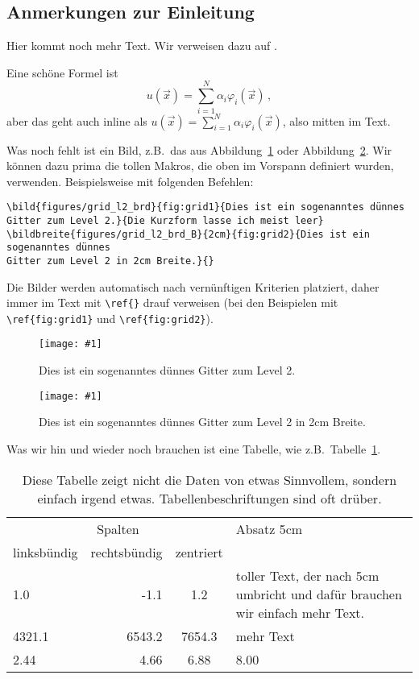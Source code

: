 \documentclass[a4paper,12pt]{llncs}
\numberwithin{equation}{section}
\newcommand{\bild}[4]{
  \begin{figure}[htbp]
    \begin{center}
      \texttt{[image: \#1]}
      \caption[#4]{#3}
      \label{#2}
    \end{center}
  \end{figure}
}
\newcommand{\bildbreite}[5]{
  \begin{figure}[htbp]
    \begin{center}
      \texttt{[image: \#1]}
      \caption[#5]{#4}
      \label{#3}
    \end{center}
  \end{figure}
}
\begin{document}
\subsection{Anmerkungen zur Einleitung}
Hier kommt noch mehr Text. Wir verweisen dazu auf
\cite{thisdocument}.

Eine schöne Formel ist
\[
u(\vec{x}) = \sum_{i=1}^N \alpha_i \varphi_i(\vec{x}) \,,
\]
aber das geht auch inline als $u(\vec{x}) = \sum_{i=1}^N \alpha_i
\varphi_i(\vec{x})$, also mitten im Text.

Was noch fehlt ist ein Bild, z.B.\ das aus
Abbildung~\ref{fig:grid1} oder Abbildung~\ref{fig:grid2}. Wir können dazu prima die tollen Makros,
die oben im Vorspann definiert wurden, verwenden. Beispielsweise mit
folgenden Befehlen:
\begin{verbatim}
\bild{figures/grid_l2_brd}{fig:grid1}{Dies ist ein sogenanntes dünnes
Gitter zum Level 2.}{Die Kurzform lasse ich meist leer}
\bildbreite{figures/grid_l2_brd_B}{2cm}{fig:grid2}{Dies ist ein sogenanntes dünnes
Gitter zum Level 2 in 2cm Breite.}{}
\end{verbatim}
Die Bilder werden automatisch nach vernünftigen Kriterien platziert,
daher immer im Text mit \verb!\ref{}! drauf verweisen (bei den
Beispielen mit \verb!\ref{fig:grid1}! und \verb!\ref{fig:grid2}!).
\bild{figures/grid_l2_brd}{fig:grid1}{Dies ist ein sogenanntes dünnes
  Gitter zum Level 2.}{Die Kurzform lasse ich meist leer}
\bildbreite{figures/grid_l2_brd}{2cm}{fig:grid2}{Dies ist ein sogenanntes dünnes
Gitter zum Level 2 in 2cm Breite.}{}

Was wir hin und wieder noch brauchen ist eine Tabelle, wie z.B.\
Tabelle~\ref{tab:irgendwas}.
\begin{table}[htbp]
  \centering
  \caption{Diese Tabelle zeigt nicht die Daten von etwas Sinnvollem,
    sondern einfach irgend etwas. Tabellenbeschriftungen sind oft drüber.}
  \label{tab:irgendwas}
  \begin{tabular}{lrcp{5cm}}
    \toprule
    \multicolumn{3}{c}{Spalten} & Absatz 5cm \\
    \cmidrule(lr){1-3}
    linksbündig & rechtsbündig & zentriert & \\
    \midrule
    1.0 & -1.1 & 1.2 & toller Text, der nach 5cm umbricht und dafür
    brauchen wir einfach mehr Text. \\
    4321.1 & 6543.2 & 7654.3 & mehr Text \\
    2.44 & 4.66 & 6.88 & 8.00 \\
    \bottomrule
  \end{tabular}
\end{table}
\end{document}
